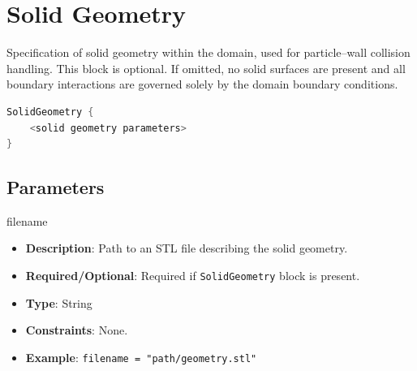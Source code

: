\section{Solid Geometry}

Specification of solid geometry within the domain, used for particle--wall collision handling. This block is optional. If omitted, no solid surfaces are present and all boundary interactions are governed solely by the domain boundary conditions.

\begin{lstlisting}[language=C++]
SolidGeometry {
    <solid geometry parameters>
}
\end{lstlisting}

\subsection*{Parameters}

filename
\vspace{\the\parameterListSpacing}
\begin{itemize}
    \item {\bf Description}: Path to an STL file describing the solid geometry.
    \item {\bf Required/Optional}: Required if \lstinline!SolidGeometry! block is present.
    \item {\bf Type}: String
    \item {\bf Constraints}: None.
    \item {\bf Example}: \lstinline!filename = "path/geometry.stl"!
\end{itemize}
